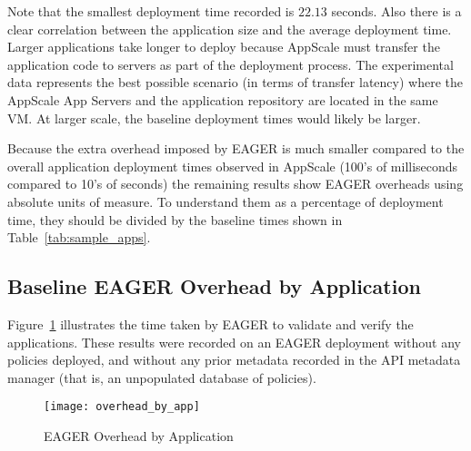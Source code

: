 Note that the smallest deployment time recorded is $22.13$ seconds. Also 
there is
a clear correlation between the application size and the average deployment
time. Larger applications take longer to deploy because AppScale must transfer
the application code to servers as part of the deployment
process.  The experimental data represents the best possible scenario (in
terms of transfer latency) where the AppScale App Servers and the application
repository are located in the same VM.  At larger scale, the baseline
deployment times would likely be larger.

Because the extra overhead imposed by EAGER is much smaller compared
to the overall application deployment times observed in AppScale
(100's of milliseconds compared to 10's of seconds) the remaining results show
EAGER overheads using absolute units of measure.  To understand them as a
percentage of deployment time, they should be divided by the baseline times
shown in Table~\ref{tab:sample_apps}.



\subsection{Baseline EAGER Overhead by Application}

Figure~\ref{fig:overhead_by_app} illustrates the time taken by EAGER to validate and verify the applications.
These results were recorded on an EAGER deployment without any policies deployed, and without any prior
metadata recorded in the API metadata manager (that is, an unpopulated 
database of policies).

\begin{figure}
\centering
\texttt{[image: overhead\_by\_app]}
\vspace{-0.01in}
\caption{EAGER Overhead by Application}
\label{fig:overhead_by_app}
\end{figure}


